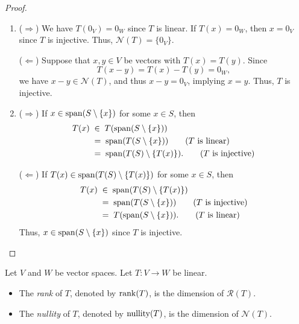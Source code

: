 \begin{proof}
  \leavevmode
  \begin{enumerate}
    \item
    ($\Rightarrow$)
    We have $T(0_V) = 0_W$ since $T$ is linear.
    If $T(x) = 0_W$, then $x = 0_V$ since $T$ is injective.
    Thus, $\mathcal{N}(T) = \{0_V\}$.

    ($\Leftarrow$)
    Suppose that $x, y \in V$ be vectors with $T(x) = T(y)$.
    Since
    \begin{equation*}
      T(x - y) = T(x) - T(y) = 0_W,
    \end{equation*}
    we have $x - y \in \mathcal{N}(T)$, and thus $x - y = 0_V$,
    implying $x = y$.
    Thus, $T$ is injective.

    \item
    ($\Rightarrow$)
    If $x \in \operatorname{span}(S \setminus \{x\})$ for some $x \in S$, then
    \begin{align*}
      T(x)
      &\; \in \; T(\operatorname{span}(S \setminus \{x\})) \\
      &\; = \; \operatorname{span}(T(S \setminus \{x\})) \tag{$T$ is linear} \\
      &\; = \; \operatorname{span}(T(S) \setminus \{T(x)\}). \tag{$T$ is injective}
    \end{align*}

    ($\Leftarrow$)
    If $T(x) \in \operatorname{span}(T(S) \setminus \{T(x)\})$ for some $x \in S$, then
    \begin{align*}
      T(x)
      &\; \in \; \operatorname{span}(T(S) \setminus \{T(x)\}) \\
      &\; = \; \operatorname{span}(T(S \setminus \{x\})) \tag{$T$ is injective} \\
      &\; = \; T(\operatorname{span}(S \setminus \{x\})). \tag{$T$ is linear}
    \end{align*}
    Thus, $x \in \operatorname{span}(S \setminus \{x\})$ since $T$ is injective.
    \qedhere
  \end{enumerate}
\end{proof}

\begin{definition}
  \label{def:rank-nullity}
  Let $V$ and $W$ be vector spaces. Let $T: V \to W$ be linear.
  \begin{itemize}
    \item The \emph{rank} of $T$, denoted by $\operatorname{rank}(T)$,
      is the dimension of $\mathcal{R}(T)$.
    \item The \emph{nullity} of $T$, denoted by $\operatorname{nullity}(T)$,
      is the dimension of $\mathcal{N}(T)$.
  \end{itemize}
\end{definition}

